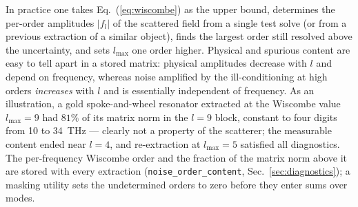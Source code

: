 \documentclass[11pt]{article}
\begin{document}
In practice one takes Eq.~(\ref{eq:wiscombe}) as the upper bound,
determines the per-order amplitudes $|f_l|$ of the scattered field from
a single test solve (or from a previous extraction of a similar object),
finds the largest order still resolved above the uncertainty, and sets
$l_{\max}$ one order higher.  Physical and spurious content are easy to
tell apart in a stored matrix: physical amplitudes decrease with $l$ and
depend on frequency, whereas noise amplified by the ill-conditioning at
high orders \emph{increases} with $l$ and is essentially independent of
frequency.  As an illustration, a gold spoke-and-wheel resonator
extracted at the Wiscombe value $l_{\max}=9$ had $81\%$ of its matrix
norm in the $l=9$ block, constant to four digits from 10 to 34~THz
--- clearly not a property of the scatterer; the
measurable content ended near $l = 4$, and re-extraction at
$l_{\max}=5$ satisfied all diagnostics.  The per-frequency Wiscombe
order and the fraction of the matrix norm above it are stored with
every extraction (\texttt{noise\_order\_content},
Sec.~\ref{sec:diagnostics}); a masking utility sets the undetermined
orders to zero before they enter sums over modes.
\end{document}
